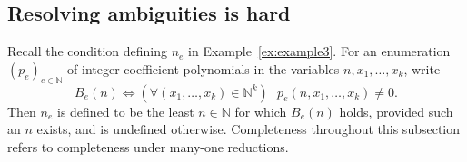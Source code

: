 \documentclass[10pt, a4paper, reqno]{amsart}
\numberwithin{equation}{section}
\theoremstyle{definition}
\theoremstyle{definition}
\begin{document}
\subsection{Resolving ambiguities is hard}
Recall the condition defining $n_e$ in Example~\ref{ex:example3}.
For an enumeration $(p_e)_{e\in\mathbb N}$ of integer-coefficient
polynomials in the variables $n,x_1,\ldots,x_k$, write
\begin{equation}\label{eq:presupposition-base-predicate}
    B_e(n)\iff
    (\forall(x_1,\ldots,x_k)\in\mathbb N^k)\textrm{ }
    p_e(n,x_1,\ldots,x_k)\ne0.
\end{equation}
Then $n_e$ is defined to be the least $n\in\mathbb N$ for which $B_e(n)$ holds, provided such an $n$ exists, and is undefined otherwise. Completeness throughout this subsection refers to completeness under many-one reductions.
\end{document}
